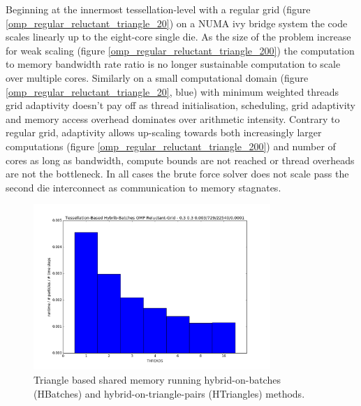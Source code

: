 Beginning at the innermost tessellation-level with a regular grid (figure \ref{omp_regular_reluctant_triangle_20}) on a NUMA ivy bridge system the code scales linearly up to the eight-core single die. As the size of the problem increase for weak scaling (figure \ref{omp_regular_reluctant_triangle_200}) the computation to memory bandwidth rate ratio is no longer sustainable computation to scale over multiple cores. Similarly on a small computational domain (figure \ref{omp_regular_reluctant_triangle_20}, blue) with minimum weighted threads grid adaptivity doesn't pay off as thread initialisation, scheduling, grid adaptivity and memory access overhead dominates over arithmetic intensity. Contrary to regular grid, adaptivity allows up-scaling towards both increasingly larger computations (figure \ref{omp_regular_reluctant_triangle_200}) and number of cores as long as bandwidth, compute bounds are not reached or thread overheads are not the bottleneck. In all cases the brute force solver does not scale pass the second die interconnect as communication to memory stagnates.

\begin{figure}[htb]
  \begin{center}
    \includegraphics[width=0.8\textwidth]{experiments/omp/hbatches_omp_triangles_200.png}
  \end{center}
  \caption{Triangle based shared memory running hybrid-on-batches (HBatches) and hybrid-on-triangle-pairs (HTriangles) methods.}
  \label{figure:hbatches_triangles_triangle_omp}
\end{figure}

